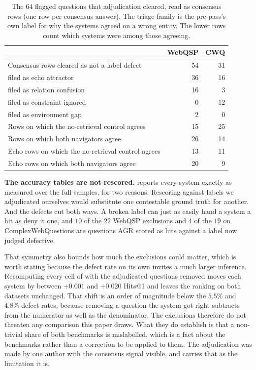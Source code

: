 \begin{table}[!tb]
  \begin{center}
    \caption{The $64$ flagged questions that adjudication cleared, read
      as consensus rows (one row per consensus answer). The triage
      family is the pre-pass's own label for why the systems agreed on
      a wrong entity. The lower rows count which systems were among
      those agreeing.}
    \label{tab:consensus}
    \footnotesize
    \begin{tabular}{|l|r|r|}
      \hline
      & \textbf{WebQSP} & \textbf{CWQ} \\
      \hline
      Consensus rows cleared as not a label defect & 54 & 31 \\
      \quad filed as echo attractor & 36 & 16 \\
      \quad filed as relation confusion & 16 & 3 \\
      \quad filed as constraint ignored & 0 & 12 \\
      \quad filed as environment gap & 2 & 0 \\
      \hline
      Rows on which the no-retrieval control agrees & 15 & 25 \\
      Rows on which both navigators agree & 26 & 14 \\
      Echo rows on which the no-retrieval control agrees & 13 & 11 \\
      Echo rows on which both navigators agree & 20 & 9 \\
      \hline
    \end{tabular}
  \end{center}
\end{table}

\textbf{The accuracy tables are not rescored.} 
reports every system exactly as measured over the full samples, for two
reasons. Rescoring against labels we adjudicated ourselves would
substitute one contestable ground truth for another. And the defects cut
both ways. A broken label can just as easily hand a system a hit as deny
it one, and $10$ of the $22$ WebQSP exclusions and $4$ of the $19$ on
ComplexWebQuestions are questions AGR scored as hits against a label now
judged defective.

That symmetry also bounds how much the exclusions could matter, which is
worth stating because the defect rate on its own invites a much larger
inference. Recomputing every cell of  with the
adjudicated questions removed moves each system by between $+0.001$ and
$+0.020$ Hits@1 and leaves the ranking on both datasets unchanged. That
shift is an order of magnitude below the $5.5\%$ and $4.8\%$ defect
rates, because removing a question the system got right subtracts from
the numerator as well as the denominator. The exclusions therefore do
not threaten any comparison this paper draws. What they do establish is
that a non-trivial share of both benchmarks is mislabelled, which is a
fact about the benchmarks rather than a correction to be applied to
them. The adjudication was made by one author with the consensus signal
visible, and  carries that as the
limitation it is.
